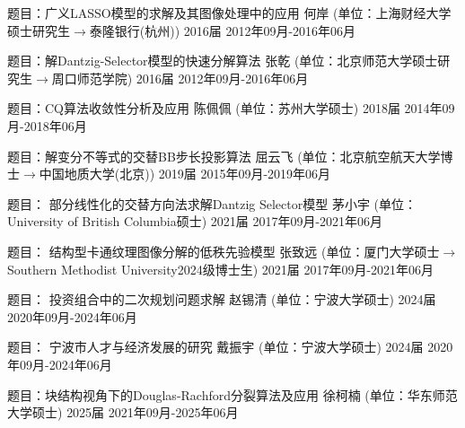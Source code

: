 \begin{cventries}
	\cventry
	{题目：广义LASSO模型的求解及其图像处理中的应用 } %
	{何岸 (单位：上海财经大学硕士研究生$\to$泰隆银行(杭州))} %
	{2016届} %
	{2012年09月-2016年06月} %
	{}
	
	\cventry
	{题目：解Dantzig-Selector模型的快速分解算法 } %
	{张乾 (单位：北京师范大学硕士研究生$\to$周口师范学院)} %
	{2016届} %
	{2012年09月-2016年06月} %
	{}
	
	\cventry
	{题目：CQ算法收敛性分析及应用 } %
	{陈佩佩 (单位：苏州大学硕士)} %
	{2018届} %
	{2014年09月-2018年06月} %
	{}
	
	\cventry
	{题目：解变分不等式的交替BB步长投影算法 } %
	{屈云飞 (单位：北京航空航天大学博士$\to$中国地质大学(北京))} %
	{2019届} %
	{2015年09月-2019年06月} %
	{}
	
	\cventry
	{题目： 部分线性化的交替方向法求解Dantzig Selector模型} %
	{茅小宇 (单位：University of British Columbia硕士)} %
	{2021届} %
	{2017年09月-2021年06月} %
	{}
	
	\cventry
	{题目： 结构型卡通纹理图像分解的低秩先验模型} %
	{张致远 (单位：厦门大学硕士$\to$Southern Methodist University2024级博士生)} %
	{2021届} %
	{2017年09月-2021年06月} %
	{}
	
		\cventry
	{题目： 投资组合中的二次规划问题求解} %
	{赵锡清 (单位：宁波大学硕士)} %
	{2024届} %
	{2020年09月-2024年06月} %
	{}
	
		
	\cventry
	{题目： 宁波市人才与经济发展的研究} %
	{戴振宇 (单位：宁波大学硕士)} %
	{2024届} %
	{2020年09月-2024年06月} %
	{}
	
		\cventry
	{题目：块结构视角下的Douglas-Rachford分裂算法及应用} %
	{徐柯楠 (单位：华东师范大学硕士)} %
	{2025届} %
	{2021年09月-2025年06月} %
	{}
	
	
\end{cventries}